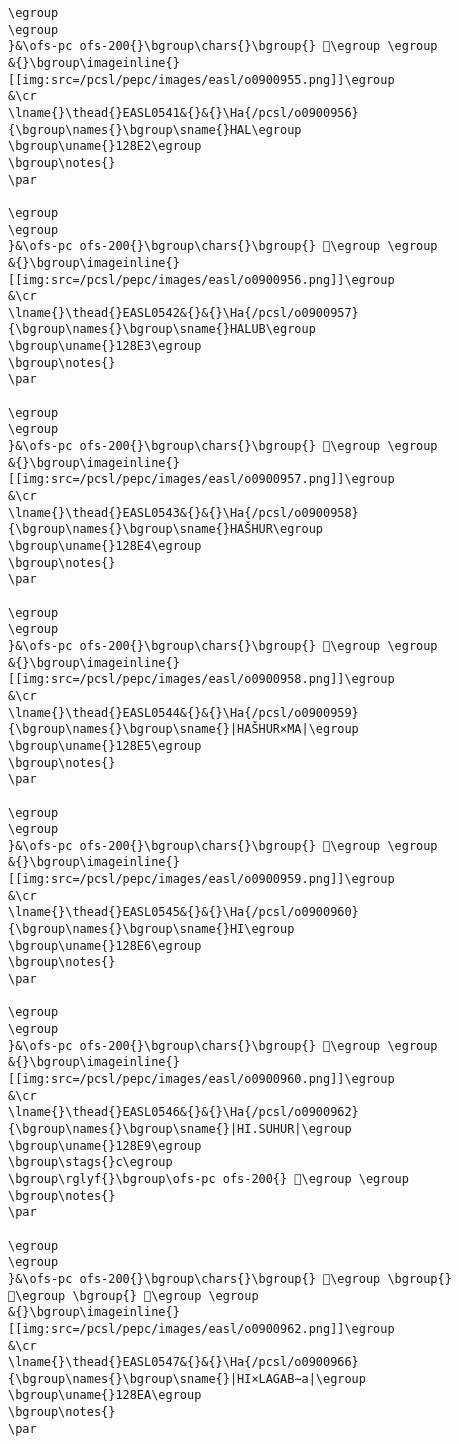 \begin{verbatim}
\egroup
\egroup
}&\ofs-pc ofs-200{}\bgroup\chars{}\bgroup{} 𒣡\egroup \egroup
&{}\bgroup\imageinline{}[[img:src=/pcsl/pepc/images/easl/o0900955.png]]\egroup
&\cr
\lname{}\thead{}EASL0541&{}&{}\Ha{/pcsl/o0900956}{\bgroup\names{}\bgroup\sname{}HAL\egroup
\bgroup\uname{}128E2\egroup
\bgroup\notes{}
\par 

\egroup
\egroup
}&\ofs-pc ofs-200{}\bgroup\chars{}\bgroup{} 𒣢\egroup \egroup
&{}\bgroup\imageinline{}[[img:src=/pcsl/pepc/images/easl/o0900956.png]]\egroup
&\cr
\lname{}\thead{}EASL0542&{}&{}\Ha{/pcsl/o0900957}{\bgroup\names{}\bgroup\sname{}HALUB\egroup
\bgroup\uname{}128E3\egroup
\bgroup\notes{}
\par 

\egroup
\egroup
}&\ofs-pc ofs-200{}\bgroup\chars{}\bgroup{} 𒣣\egroup \egroup
&{}\bgroup\imageinline{}[[img:src=/pcsl/pepc/images/easl/o0900957.png]]\egroup
&\cr
\lname{}\thead{}EASL0543&{}&{}\Ha{/pcsl/o0900958}{\bgroup\names{}\bgroup\sname{}HAŠHUR\egroup
\bgroup\uname{}128E4\egroup
\bgroup\notes{}
\par 

\egroup
\egroup
}&\ofs-pc ofs-200{}\bgroup\chars{}\bgroup{} 𒣤\egroup \egroup
&{}\bgroup\imageinline{}[[img:src=/pcsl/pepc/images/easl/o0900958.png]]\egroup
&\cr
\lname{}\thead{}EASL0544&{}&{}\Ha{/pcsl/o0900959}{\bgroup\names{}\bgroup\sname{}|HAŠHUR×MA|\egroup
\bgroup\uname{}128E5\egroup
\bgroup\notes{}
\par 

\egroup
\egroup
}&\ofs-pc ofs-200{}\bgroup\chars{}\bgroup{} 𒣥\egroup \egroup
&{}\bgroup\imageinline{}[[img:src=/pcsl/pepc/images/easl/o0900959.png]]\egroup
&\cr
\lname{}\thead{}EASL0545&{}&{}\Ha{/pcsl/o0900960}{\bgroup\names{}\bgroup\sname{}HI\egroup
\bgroup\uname{}128E6\egroup
\bgroup\notes{}
\par 

\egroup
\egroup
}&\ofs-pc ofs-200{}\bgroup\chars{}\bgroup{} 𒣦\egroup \egroup
&{}\bgroup\imageinline{}[[img:src=/pcsl/pepc/images/easl/o0900960.png]]\egroup
&\cr
\lname{}\thead{}EASL0546&{}&{}\Ha{/pcsl/o0900962}{\bgroup\names{}\bgroup\sname{}|HI.SUHUR|\egroup
\bgroup\uname{}128E9\egroup
\bgroup\stags{}c\egroup
\bgroup\rglyf{}\bgroup\ofs-pc ofs-200{} 𒣩\egroup \egroup
\bgroup\notes{}
\par 

\egroup
\egroup
}&\ofs-pc ofs-200{}\bgroup\chars{}\bgroup{} 𒣧\egroup \bgroup{} 𒣨\egroup \bgroup{} 𒣩\egroup \egroup
&{}\bgroup\imageinline{}[[img:src=/pcsl/pepc/images/easl/o0900962.png]]\egroup
&\cr
\lname{}\thead{}EASL0547&{}&{}\Ha{/pcsl/o0900966}{\bgroup\names{}\bgroup\sname{}|HI×LAGAB∼a|\egroup
\bgroup\uname{}128EA\egroup
\bgroup\notes{}
\par 


\end{verbatim}
